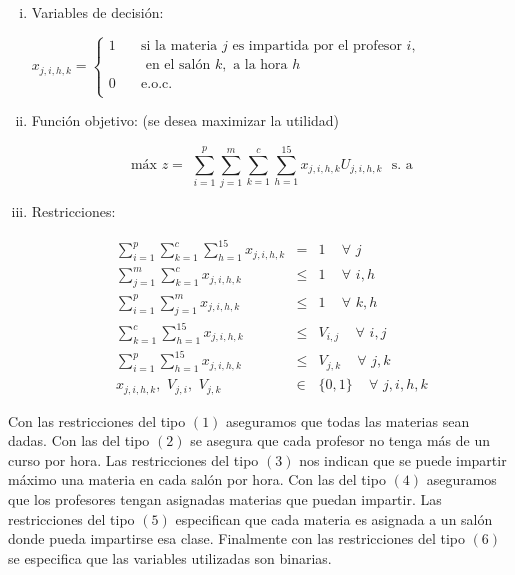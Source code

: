 \begin{enumerate}[i)]
\item Variables de decisión:

$ x_{j,i,h,k} =
  \begin{cases}
1  & \quad \text{si la materia } j \text{ es impartida por el profesor  } i,\\
   &\quad \text{ en el salón } k, \text{ a la hora } h\\
0  & \quad \text{e.o.c. } \\
\end{cases}
$

\item Función objetivo: (se desea maximizar la utilidad)

\begin{equation*}
\text{máx} \,\, z =  \,\, \displaystyle \sum_{i=1}^{p} \sum_{j=1}^{m} \sum_{k=1}^{c} \sum_{h=1}^{15} x_{j,i,h,k} U_{j,i,h,k} \,\,\,\, \text{s. a}
\end{equation*}

\item Restricciones:
  
\begin{eqnarray}
\displaystyle \sum_{i=1}^{p} \sum_{k=1}^{c} \sum_{h=1}^{15} x_{j,i,h,k} &=& 1  \,\,\,\,\,\,\, \forall \,\, j\\
\displaystyle \sum_{j=1}^{m} \sum_{k=1}^{c} x_{j,i,h,k} &\leqslant& 1 \,\,\,\,\,\,\, \forall \,\, i,h\\
\displaystyle \sum_{i=1}^{p} \sum_{j=1}^{m} x_{j,i,h,k} &\leqslant& 1 \,\,\,\,\,\,\, \forall \,\, k,h\\
\displaystyle \sum_{k=1}^{c} \sum_{h=1}^{15} x_{j,i,h,k} &\leqslant& V_{i,j} \,\,\,\,\,\,\, \forall \,\, i,j\\
\displaystyle \sum_{i=1}^{p} \sum_{h=1}^{15} x_{j,i,h,k} &\leqslant& V_{j,k}  \,\,\,\,\,\,\, \forall \,\, j,k\\
x_{j,i,h,k}, \,\, V_{j,i}, \,\, V_{j,k} &\in& \{0,1\} \,\,\,\,\,\,\, \forall \,\, j,i,h,k
\end{eqnarray}
\end{enumerate}

Con las restricciones del tipo $(1)$ aseguramos que todas las materias sean dadas. Con las del tipo $(2)$ se asegura que cada profesor no tenga más de un curso por hora. Las restricciones del tipo $(3)$ nos indican que se puede impartir máximo una materia en cada salón por hora. Con las del tipo $(4)$ aseguramos que los profesores tengan asignadas materias que puedan impartir. Las restricciones del tipo $(5)$ especifican que cada materia es asignada a un salón donde pueda impartirse esa clase. Finalmente con las restricciones del tipo $(6)$ se especifica que las variables utilizadas son binarias.

